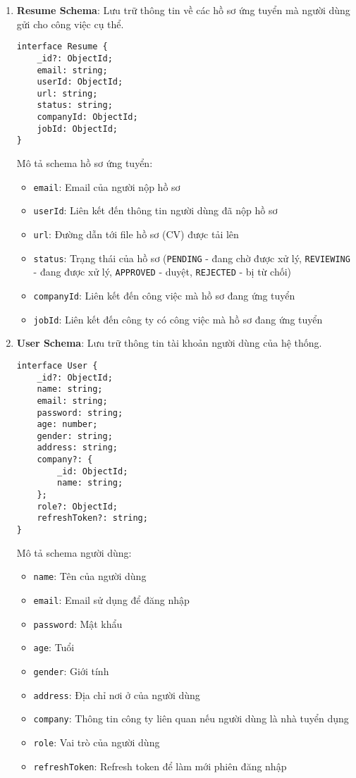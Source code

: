 \begin{enumerate}
    \vspace{1mm}
    \item \textbf{Resume Schema}: Lưu trữ thông tin về các hồ sơ ứng tuyển mà người dùng gửi cho công việc cụ thể.
    \begin{lstlisting}[numbers=none]
interface Resume {
    _id?: ObjectId;
    email: string;
    userId: ObjectId;
    url: string;
    status: string;
    companyId: ObjectId;
    jobId: ObjectId; 
}
    \end{lstlisting}
    Mô tả schema hồ sơ ứng tuyển:
    \begin{itemize}
        \item \texttt{email}: Email của người nộp hồ sơ
        \item \texttt{userId}: Liên kết đến thông tin người dùng đã nộp hồ sơ
        \item \texttt{url}: Đường dẫn tới file hồ sơ (CV) được tải lên
        \item \texttt{status}: Trạng thái của hồ sơ (\texttt{PENDING} - đang chờ được xử lý, \texttt{REVIEWING} -  đang được xử lý, \texttt{APPROVED} - duyệt, \texttt{REJECTED} - bị từ chối)
        \item \texttt{companyId}: Liên kết đến công việc mà hồ sơ đang ứng tuyển
        \item \texttt{jobId}: Liên kết đến công ty có công việc mà hồ sơ đang ứng tuyển
    \end{itemize}

    \vspace{1mm}
    \item \textbf{User Schema}: Lưu trữ thông tin tài khoản người dùng của hệ thống.
    \begin{lstlisting}[numbers=none]
interface User {
    _id?: ObjectId;
    name: string;
    email: string;
    password: string;
    age: number;
    gender: string;
    address: string;
    company?: {
        _id: ObjectId;
        name: string;
    };
    role?: ObjectId;
    refreshToken?: string;  
}
    \end{lstlisting}
    Mô tả schema người dùng:
    \begin{itemize}
        \item \texttt{name}: Tên của người dùng
        \item \texttt{email}: Email sử dụng để đăng nhập
        \item \texttt{password}: Mật khẩu
        \item \texttt{age}: Tuổi
        \item \texttt{gender}: Giới tính
        \item \texttt{address}: Địa chỉ nơi ở của người dùng
        \item \texttt{company}: Thông tin công ty liên quan nếu người dùng là nhà tuyển dụng
        \item \texttt{role}: Vai trò của người dùng
        \item \texttt{refreshToken}: Refresh token để làm mới phiên đăng nhập
    \end{itemize}
    

\end{enumerate}
